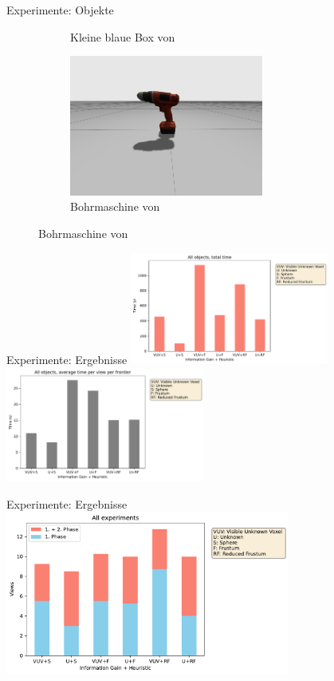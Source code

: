\documentclass[aspectratio=169]{beamer}
\begin{document}
\begin{frame}{Experimente: Objekte}
\begin{figure}[h]
\begin{subfigure}{0.35\textwidth}
			\caption{Kleine blaue Box von \cite{GazeboFuel-OpenRobotics-Small-Blue-Box}}
		\end{subfigure}
		\begin{subfigure}{0.35\textwidth}
			\centering
			\includegraphics[width=0.7\textwidth]{Graphics/drill}
			\caption{Bohrmaschine von \cite{GazeboFuel-OpenRobotics-Black-and-Decker-Cordless-Drill}}
		\end{subfigure}
	\end{figure}

\end{frame}

\begin{frame}{Experimente: Ergebnisse}
	\centering
	\includegraphics[width=0.49\textwidth]{Graphics/all_total_times.pdf}
	\includegraphics[width=0.49\textwidth]{Graphics/all_avg_times_frontiers.pdf}
\end{frame}

\begin{frame}{Experimente: Ergebnisse}
	\centering
	\includegraphics[width=0.7\textwidth]{Graphics/all_num_views.pdf}
\end{frame}
\end{document}
